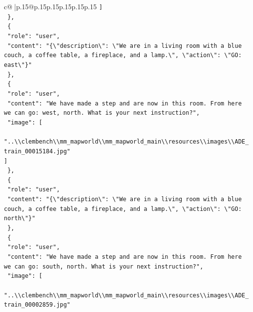 \documentclass{article}
\begin{document}
{\begin{supertabular}{c@{$\;$}|p{.15\linewidth}@{}p{.15\linewidth}p{.15\linewidth}p{.15\linewidth}p{.15\linewidth}p{.15\linewidth}}
{{{\texttt{    {]}} \\
\texttt{  \},} \\
\texttt{  \{} \\
\texttt{    "role": "user",} \\
\texttt{    "content": "\{\textbackslash{}"description\textbackslash{}": \textbackslash{}"We are in a living room with a blue couch, a coffee table, a fireplace, and a lamp.\textbackslash{}", \textbackslash{}"action\textbackslash{}": \textbackslash{}"GO: east\textbackslash{}"\}"} \\
\texttt{  \},} \\
\texttt{  \{} \\
\texttt{    "role": "user",} \\
\texttt{    "content": "We have made a step and are now in this room. From here we can go: west, north. What is your next instruction?",} \\
\texttt{    "image": {[}} \\
\texttt{      "..\textbackslash{}\textbackslash{}clembench\textbackslash{}\textbackslash{}mm\_mapworld\textbackslash{}\textbackslash{}mm\_mapworld\_main\textbackslash{}\textbackslash{}resources\textbackslash{}\textbackslash{}images\textbackslash{}\textbackslash{}ADE\_train\_00015184.jpg"} \\
\texttt{    {]}} \\
\texttt{  \},} \\
\texttt{  \{} \\
\texttt{    "role": "user",} \\
\texttt{    "content": "\{\textbackslash{}"description\textbackslash{}": \textbackslash{}"We are in a living room with a blue couch, a coffee table, a fireplace, and a lamp.\textbackslash{}", \textbackslash{}"action\textbackslash{}": \textbackslash{}"GO: north\textbackslash{}"\}"} \\
\texttt{  \},} \\
\texttt{  \{} \\
\texttt{    "role": "user",} \\
\texttt{    "content": "We have made a step and are now in this room. From here we can go: south, north. What is your next instruction?",} \\
\texttt{    "image": {[}} \\
\texttt{      "..\textbackslash{}\textbackslash{}clembench\textbackslash{}\textbackslash{}mm\_mapworld\textbackslash{}\textbackslash{}mm\_mapworld\_main\textbackslash{}\textbackslash{}resources\textbackslash{}\textbackslash{}images\textbackslash{}\textbackslash{}ADE\_train\_00002859.jpg"} \\
}}}
\end{supertabular}}
\end{document}
